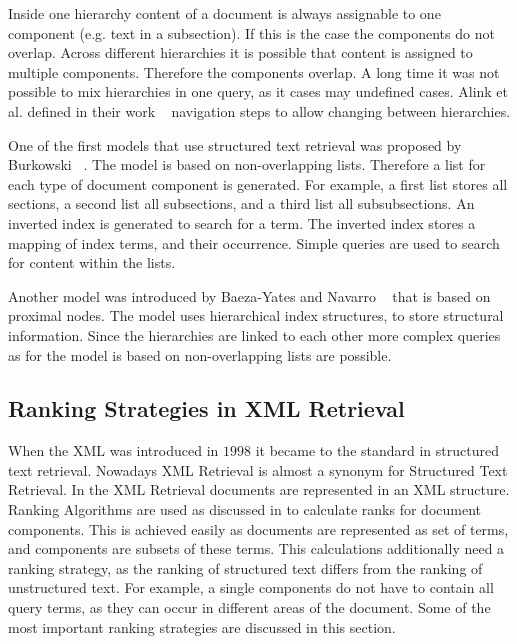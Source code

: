 Inside one hierarchy content of a document is always assignable to one component (e.g. text in a subsection). If this is the case the components do not overlap. Across different hierarchies it is possible that content is assigned to multiple components. Therefore the components overlap. A long time it was not possible to mix hierarchies in one query, as it cases may undefined cases. Alink et al. defined in their work ~\cite{AlinkBBV06} navigation steps to allow changing between hierarchies.  

One of the first models that use structured text retrieval was proposed by Burkowski ~\cite{BURKOWSKI1992333, Burkowski92}. The model is based on non-overlapping lists. Therefore a list for each type of document component is generated. For example, a first list stores all sections, a second list all subsections, and a third list all subsubsections. An inverted index is generated to search for a term. The inverted index stores a mapping of index terms, and their occurrence. Simple queries are used to search for content within the lists.

Another model was introduced by Baeza-Yates and Navarro ~\cite{GB95, GB97} that is based on proximal nodes. The model uses hierarchical index structures, to store structural information. Since the hierarchies are linked to each other more complex queries as for the model is based on non-overlapping lists are possible. 

\subsection{Ranking Strategies in XML Retrieval}
\label{sec:ranking_strategies_in_xml_retrieval}

When the XML was introduced in $1998$ it became to the standard in structured text retrieval. Nowadays XML Retrieval is almost a synonym for Structured Text Retrieval. In the XML Retrieval documents are represented in an XML structure. Ranking Algorithms are used as discussed in  to calculate ranks for document components. This is achieved easily as documents are represented as set of terms, and components are subsets of these terms. This calculations additionally need a ranking strategy, as the ranking of structured text differs from the ranking of unstructured text. For example, a single components do not have to contain all query terms, as they can occur in different areas of the document. Some of the most important ranking strategies are discussed in this section.

